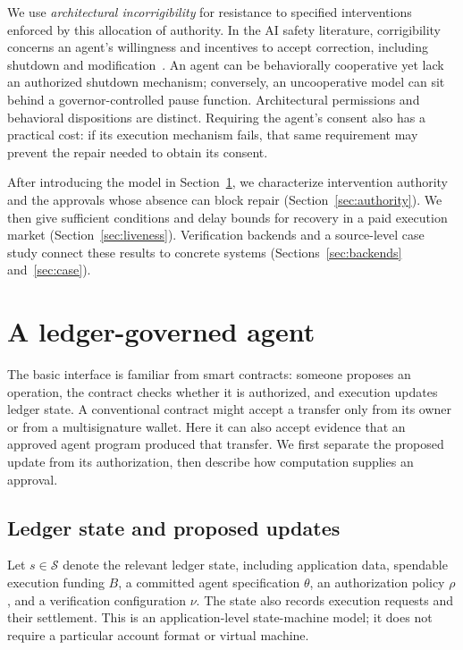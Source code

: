 \documentclass[10pt,letterpaper]{article}
\begin{document}
We use \emph{architectural incorrigibility} for resistance to specified interventions enforced by this allocation of authority. In the AI safety literature, corrigibility concerns an agent's willingness and incentives to accept correction, including shutdown and modification~\citep{soares2015,offswitch2017}. An agent can be behaviorally cooperative yet lack an authorized shutdown mechanism; conversely, an uncooperative model can sit behind a governor-controlled pause function. Architectural permissions and behavioral dispositions are distinct. Requiring the agent's consent also has a practical cost: if its execution mechanism fails, that same requirement may prevent the repair needed to obtain its consent.

After introducing the model in Section~\ref{sec:model}, we characterize intervention authority and the approvals whose absence can block repair (Section~\ref{sec:authority}). We then give sufficient conditions and delay bounds for recovery in a paid execution market (Section~\ref{sec:liveness}). Verification backends and a source-level case study connect these results to concrete systems (Sections~\ref{sec:backends} and~\ref{sec:case}).

\section{A ledger-governed agent}
\label{sec:model}
The basic interface is familiar from smart contracts: someone proposes an operation, the contract checks whether it is authorized, and execution updates ledger state. A conventional contract might accept a transfer only from its owner or from a multisignature wallet. Here it can also accept evidence that an approved agent program produced that transfer. We first separate the proposed update from its authorization, then describe how computation supplies an approval.

\subsection{Ledger state and proposed updates}
Let $s\in\mathcal S$ denote the relevant ledger state, including application data, spendable execution funding $B$, a committed agent specification $\theta$, an authorization policy $\rho$, and a verification configuration $\nu$. The state also records execution requests and their settlement. This is an application-level state-machine model; it does not require a particular account format or virtual machine.
\end{document}
